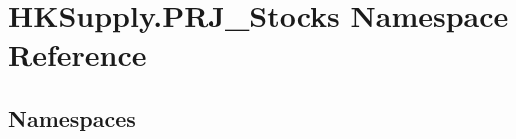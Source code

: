 \hypertarget{namespace_h_k_supply_1_1_p_r_j___stocks}{}\section{H\+K\+Supply.\+P\+R\+J\+\_\+\+Stocks Namespace Reference}
\label{namespace_h_k_supply_1_1_p_r_j___stocks}
\subsection*{Namespaces}
\begin{DoxyCompactItemize}
\end{DoxyCompactItemize}
